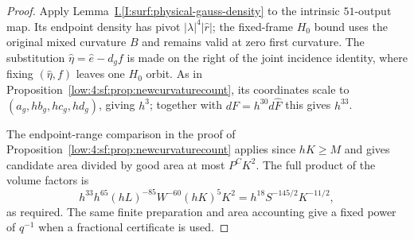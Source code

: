\documentclass[11pt]{amsart}
\theoremstyle{definition}
\theoremstyle{remark}
\numberwithin{equation}{section}
\newcommand{\partIref}[1]{\hyperref[I:#1]{I.\ref*{I:#1}}}
\begin{document}
\begin{proof}
Apply Lemma~\partIref{surf:physical-gauss-density} to the intrinsic $51$-output map. Its endpoint density has pivot $|\lambda|^4|\widehat r|$; the fixed-frame $H_0$ bound uses the original mixed curvature $B$ and remains valid at zero first curvature. The substitution $\widehat\eta=\widehat e-d_gf$ is made on the right of the joint incidence identity, where fixing $(\widehat\eta,f)$ leaves one $H_0$ orbit. As in Proposition~\ref{low:4:sf:prop:newcurvaturecount}, its coordinates scale to $(a_g,hb_g,hc_g,hd_g)$, giving $h^3$; together with $dF=h^{30}d\widehat F$ this gives $h^{33}$.

The endpoint-range comparison in the proof of Proposition~\ref{low:4:sf:prop:newcurvaturecount} applies since $hK\ge M$ and gives candidate area divided by good area at most $P^CK^2$. The full product of the volume factors is
\[
h^{33}h^{65}(hL)^{-85}W^{-60}(hK)^5K^2
 =h^{18}S^{-145/2}K^{-11/2},
\]
as required. The same finite preparation and area accounting give a fixed power of $q^{-1}$ when a fractional certificate is used.
\end{proof}
\end{document}

